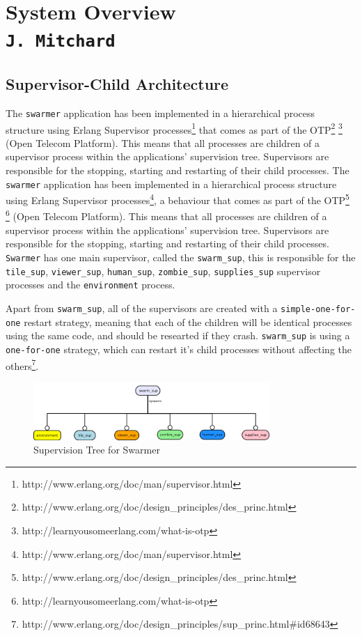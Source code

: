 \pagestyle{empty}
\section{System Overview\\{\small\tt J.~Mitchard}}
\label{system_overview}
\subsection{Supervisor-Child Architecture}
\label{otp_description}
The \verb+swarmer+ application has been implemented in a hierarchical process structure using Erlang Supervisor processes\footnote{http://www.erlang.org/doc/man/supervisor.html} that comes as part of the OTP\footnote{http://www.erlang.org/doc/design\_principles/des\_princ.html} \footnote{http://learnyousomeerlang.com/what-is-otp} (Open Telecom Platform). This means that all processes are children of a supervisor process within the applications' supervision tree. Supervisors are responsible for the stopping, starting and restarting of their child processes.
%
\label{supervisor_arch}
The \verb+swarmer+ application has been implemented in a hierarchical process structure using Erlang Supervisor processes\footnote{http://www.erlang.org/doc/man/supervisor.html}, a behaviour that comes as part of the OTP\footnote{http://www.erlang.org/doc/design\_principles/des\_princ.html} \footnote{http://learnyousomeerlang.com/what-is-otp} (Open Telecom Platform). This means that all processes are children of a supervisor process within the applications' supervision tree. Supervisors are responsible for the stopping, starting and restarting of their child processes.
\verb+Swarmer+ has one main supervisor, called the \verb+swarm_sup+, this is responsible for the \verb+tile_sup+, \verb+viewer_sup+, \verb+human_sup+, \verb+zombie_sup+, \verb+supplies_sup+ supervisor processes and the \verb+environment+ process.

Apart from \verb+swarm_sup+, all of the supervisors are created with a \verb+simple-one-for-one+ restart strategy, meaning that each of the children will be identical processes using the same code, and should be researted if they crash. \verb+swarm_sup+ is using a \verb+one-for-one+ strategy, which can restart it's child processes without affecting the others\footnote{http://www.erlang.org/doc/design\_principles/sup\_princ.html\#id68643}.

\begin{figure}[h]
  \centering
  \includegraphics[width=0.8\textwidth]{img/supervisor.png}
\caption{Supervision Tree for Swarmer}
    \label{fig:sup_tree}
\end{figure}

